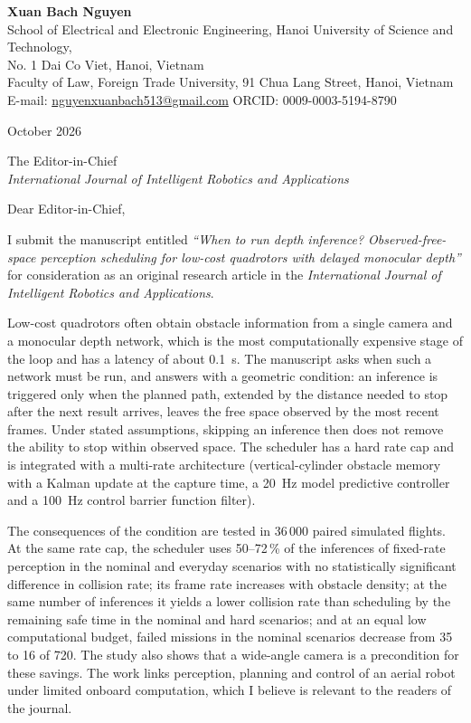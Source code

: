 \documentclass[11pt,a4paper]{article}
\begin{document}
\textbf{Xuan Bach Nguyen}\\
School of Electrical and Electronic Engineering, Hanoi University of Science and Technology,\\
No. 1 Dai Co Viet, Hanoi, Vietnam\\
Faculty of Law, Foreign Trade University, 91 Chua Lang Street, Hanoi, Vietnam\\
E-mail: \href{mailto:nguyenxuanbach513@gmail.com}{nguyenxuanbach513@gmail.com} \quad ORCID: 0009-0003-5194-8790

 October 2026

\medskip
The Editor-in-Chief\\
\emph{International Journal of Intelligent Robotics and Applications}

\medskip
Dear Editor-in-Chief,

I submit the manuscript entitled \emph{``When to run depth inference? Observed-free-space perception scheduling for
low-cost quadrotors with delayed monocular depth''} for consideration as an original research article in the
\emph{International Journal of Intelligent Robotics and Applications}.

Low-cost quadrotors often obtain obstacle information from a single camera and a monocular depth network, which is
the most computationally expensive stage of the loop and has a latency of about 0.1~s. The manuscript asks when such
a network must be run, and answers with a geometric condition: an inference is triggered only when the planned path,
extended by the distance needed to stop after the next result arrives, leaves the free space observed by the most
recent frames. Under stated assumptions, skipping an inference then does not remove the ability to stop within
observed space. The scheduler has a hard rate cap and is integrated with a multi-rate architecture (vertical-cylinder
obstacle memory with a Kalman update at the capture time, a 20~Hz model predictive controller and a 100~Hz control
barrier function filter).

The consequences of the condition are tested in 36\,000 paired simulated flights. At the same rate cap, the
scheduler uses 50--72\,\% of the inferences of fixed-rate perception in the nominal and everyday scenarios with no
statistically significant difference in collision rate; its frame rate increases with obstacle density; at the same
number of inferences it yields a lower collision rate than scheduling by the remaining safe time in the
nominal and hard scenarios; and at an equal low
computational budget, failed missions in the nominal scenarios decrease from 35 to 16 of 720. The study also shows
that a wide-angle camera is a precondition for these savings. The work links perception, planning and control of an
aerial robot under limited onboard computation, which I believe is relevant to the readers of the journal.
\end{document}
